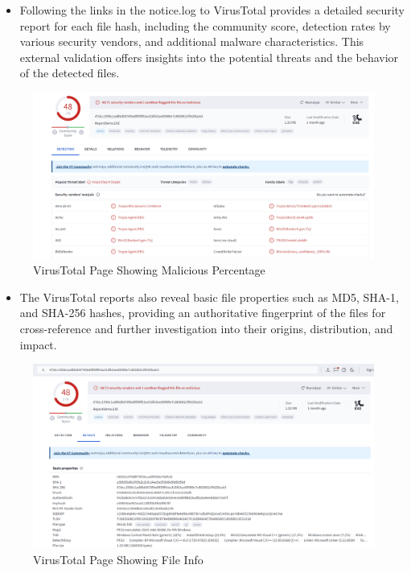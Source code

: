 \begin{itemize}
    \item Following the links in the notice.log to VirusTotal provides a detailed security report for each file hash, including the community score, detection rates by various security vendors, and additional malware characteristics. This external validation offers insights into the potential threats and the behavior of the detected files.
\end{itemize}
\begin{figure}[H]
    \centering
    \includegraphics[width=1\linewidth]{images//file_malware/file_malware_4.png}
    \caption{VirusTotal Page Showing Malicious Percentage}
    \label{fig:enter-label}
\end{figure}

\begin{itemize}
    \item The VirusTotal reports also reveal basic file properties such as MD5, SHA-1, and SHA-256 hashes, providing an authoritative fingerprint of the files for cross-reference and further investigation into their origins, distribution, and impact.
\end{itemize}
\begin{figure}[H]
    \centering
    \includegraphics[width=1\linewidth]{images//file_malware/file_malware_5.png}
    \caption{VirusTotal Page Showing File Info}
    \label{fig:enter-label}
\end{figure}
